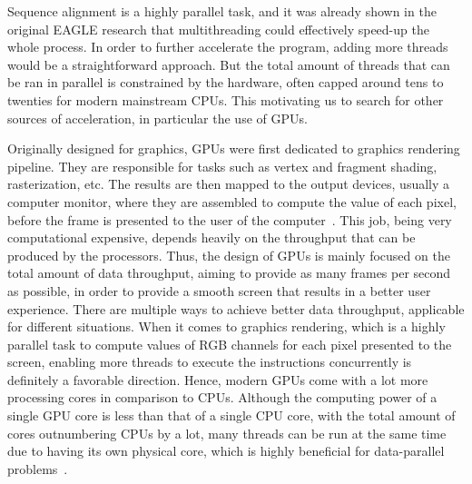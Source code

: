 \documentclass{PHlab-thesis}
\begin{document}
Sequence alignment is a highly parallel task, and it was already shown in the original EAGLE research that multithreading could effectively speed-up the whole process.  In order to further accelerate the program, adding more threads would be a straightforward approach.  But the total amount of threads that can be ran in parallel is constrained by the hardware, often capped around tens to twenties for modern mainstream CPUs.  This motivating us to search for other sources of acceleration, in particular the use of GPUs.

Originally designed for graphics, GPUs were first dedicated to graphics rendering pipeline.  They are responsible for tasks such as vertex and fragment shading, rasterization, etc.  The results are then mapped to the output devices, usually a computer monitor, where they are assembled to compute the value of each pixel, before the frame is presented to the user of the computer~\cite{foley1994introduction,owens2008gpu}.  This job, being very computational expensive, depends heavily on the throughput that can be produced by the processors.  Thus, the design of GPUs is mainly focused on the total amount of data throughput, aiming to provide as many frames per second as possible, in order to provide a smooth screen that results in a better user experience.  There are multiple ways to achieve better data throughput, applicable for different situations. When it comes to graphics rendering, which is a highly parallel task to compute values of RGB channels for each pixel presented to the screen, enabling more threads to execute the instructions concurrently is definitely a favorable direction. Hence, modern GPUs come with a lot more processing cores in comparison to CPUs. Although the computing power of a single GPU core is less than that of a single CPU core, with the total amount of cores outnumbering CPUs by a lot, many threads can be run at the same time due to having its own physical core, which is highly beneficial for data-parallel problems~\cite{navarro2014survey}.
\end{document}
